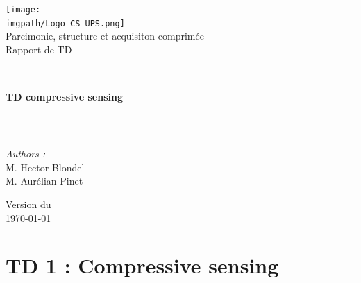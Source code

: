 \documentclass[a4paper,12pt,french]{article}
\begin{document}

\begin{titlepage}
\begin{center}

\texttt{[image: \\imgpath/Logo-CS-UPS.png]}\\[1cm]

{\large Parcimonie, structure et acquisiton comprimée}\\[0.5cm]

{\large Rapport de TD}\\[0.5cm]

\rule{\linewidth}{0.5mm} \\[0.4cm]
{ \huge \bfseries TD compressive sensing \\[0.4cm] }
\rule{\linewidth}{0.5mm} \\[1.5cm]

\noindent
\begin{minipage}{0.4\textwidth}
  \begin{flushleft} \large
    \emph{Authors :}\\
    M. Hector Blondel\\
        M. Aurélian Pinet\\
      \end{flushleft}
\end{minipage}%


\vfill

{\large Version du\\ \today}

\end{center}
\end{titlepage}


  \thispagestyle{empty}
  \tableofcontents
  \newpage


\hypertarget{td-1-compressive-sensing}{%
\section{TD 1 : Compressive sensing}\label{td-1-compressive-sensing}}
\end{document}

